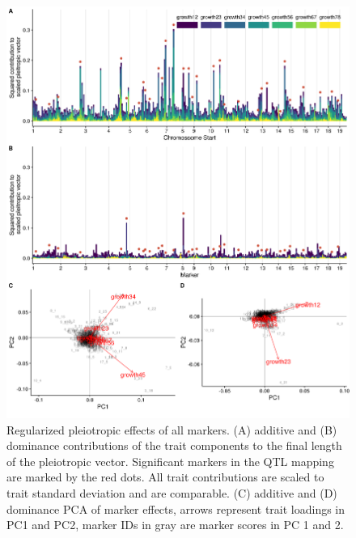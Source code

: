 \begin{refsection}
\begin{figure}
\includegraphics[width=\linewidth]{chapter_JoH-Melo_etal/media/growth_pleiotropic_partition_ad_dm_GP.png}
\caption[Pleiotropic effects of all markers]{Regularized pleiotropic effects of all markers. (A) additive
and (B) dominance contributions of the trait components to the final
length of the pleiotropic vector. Significant markers in the QTL mapping are marked by
the red dots. All trait contributions are scaled to trait standard
deviation and are comparable. (C) additive and (D) dominance PCA of marker effects, arrows
represent trait loadings in PC1 and PC2, marker IDs in gray are marker
scores in PC 1 and 2.}
\label{fig:joh:pleiopartGP}
\end{figure}


\end{refsection}
